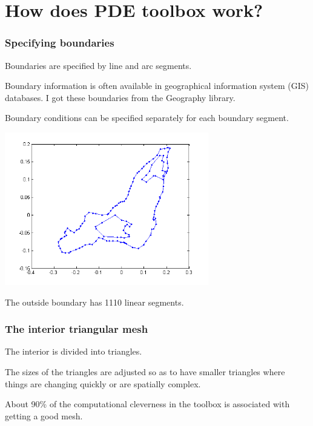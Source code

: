\documentclass[11pt]{beamer}
\begin{document}

\section{How does PDE toolbox work?}

\begin{frame}

\frametitle{Specifying boundaries}

\bi
  \item Boundaries are specified by line and arc segments.
  \item Boundary information is often available in
  geographical information system (GIS) databases.  I got these
  boundaries from the Geography library.
  \item Boundary conditions can be specified separately for each
  boundary segment.
\ei

\end{frame}


\begin{frame}

\includegraphics[width=3.5in]{figs/mtlboundary.png}

The outside boundary has 1110 linear segments.

\end{frame}


\begin{frame}


\frametitle{The interior triangular mesh}

\bi
  \item The interior is divided into triangles.
  \item The sizes of the triangles are adjusted so
  as to have smaller triangles where things are changing
  quickly or are spatially complex.
  \item About 90\% of the computational cleverness in the toolbox
  is associated with getting a good mesh.
\ei

\end{frame}
\end{document}
